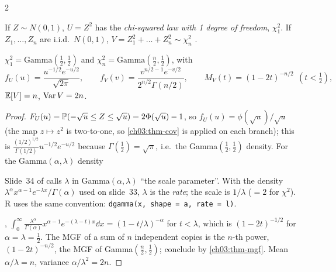 \begin{paracol}{2}
\begin{definition}
If $Z\sim N(0,1)$, $U=Z^2$ has the \emph{chi-squared law with 1 degree of freedom}, $\chi^2_1$. If $Z_1,\dots,Z_n$ are
i.i.d.\ $N(0,1)$, $V=Z_1^2+\dots+Z_n^2\sim\chi^2_n$ .
\end{definition}
\begin{proposition}
$\chi^2_1=\mathrm{Gamma}(\frac12,\frac12)$ and $\chi^2_n=\mathrm{Gamma}(\frac n2,\frac12)$, with
\[
  f_U(u)=\frac{u^{-1/2}e^{-u/2}}{\sqrt{2\pi}},\qquad
  f_V(v)=\frac{v^{n/2-1}e^{-v/2}}{2^{n/2}\Gamma(n/2)},\qquad M_V(t)=(1-2t)^{-n/2}\ \ (t<\tfrac12),
\]
$\mathbb{E}[V]=n$, $\operatorname{Var} V=2n$.
\end{proposition}
\begin{proof}
$F_U(u)=\mathbb{P}(-\sqrt u\le Z\le\sqrt u)=2\Phi(\sqrt u)-1$, so $f_U(u)=\phi(\sqrt u)/\sqrt u$ (the map $z\mapsto z^2$ is two-to-one,
so \cref{ch03:thm-cov} is applied on each branch); this is $\frac{(1/2)^{1/2}}{\Gamma(1/2)}u^{-1/2}e^{-u/2}$ because $\Gamma(\frac12)=\sqrt\pi$,
i.e.\ the Gamma$(\frac12,\frac12)$ density. For the Gamma$(\alpha,\lambda)$ density\begin{coursenote}
Slide~34 of  calls $\lambda$ in Gamma$(\alpha,\lambda)$ ``the scale parameter''. With the density
$\lambda^\alpha x^{\alpha-1}e^{-\lambda x}/\Gamma(\alpha)$ used on slide~33, $\lambda$ is the \emph{rate}; the scale is $1/\lambda$ ($=2$ for
$\chi^2$). R uses the same convention: \texttt{dgamma(x, shape = a, rate = l)}.
\end{coursenote},
$\int_0^\infty\frac{\lambda^\alpha}{\Gamma(\alpha)}x^{\alpha-1}e^{-(\lambda-t)x}\dd x=(1-t/\lambda)^{-\alpha}$ for $t<\lambda$, which is
$(1-2t)^{-1/2}$ for $\alpha=\lambda=\frac12$. The MGF of a sum of $n$ independent copies is the $n$-th power, $(1-2t)^{-n/2}$,
the MGF of Gamma$(\frac n2,\frac12)$; conclude by \cref{ch03:thm-mgf}. Mean $\alpha/\lambda=n$, variance $\alpha/\lambda^2=2n$.
\end{proof}


\end{paracol}
